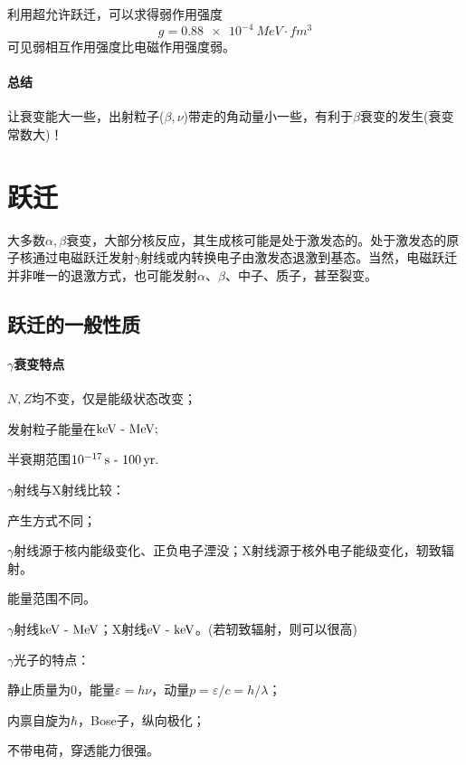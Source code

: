 利用超允许跃迁，可以求得弱作用强度
\[
	g=\SI{0.88e-4}{MeV\cdot fm^3}
\]
可见弱相互作用强度比电磁作用强度弱。
\paragraph{总结}
让衰变能大一些，出射粒子($\beta,\nu$)带走的角动量小一些，有利于$\beta$衰变的发生(衰变常数大)！

\section{\textgamma 跃迁}

大多数$\alpha,\beta$衰变，大部分核反应，其生成核可能是处于激发态的。处于激发态的原子核通过电磁跃迁发射$\gamma$射线或内转换电子由激发态退激到基态。当然，电磁跃迁并非唯一的退激方式，也可能发射$\alpha$、$\beta$、中子、质子，甚至裂变。

\subsection{\textgamma 跃迁的一般性质}

\paragraph{$\gamma$衰变特点}
\begin{compactenum}
	\item $N,Z$均不变，仅是能级状态改变；
	\item 发射粒子能量在$\si{keV}\vs\si{MeV};$
	\item 半衰期范围$\SI{e-17}{s}\vs\SI{100}{yr}.$
\end{compactenum}
$\gamma$射线与X射线比较：
\begin{compactenum}
	\item 产生方式不同；
	
	$\gamma$射线源于核内能级变化、正负电子湮没；X射线源于核外电子能级变化，轫致辐射。
	\item 能量范围不同。
	
	$\gamma$射线$\si{keV}\vs\si{MeV}$；X射线$\si{eV}\vs\si{keV}$。(若轫致辐射，则可以很高)
\end{compactenum}
$\gamma$光子的特点：
\begin{compactenum}
	\item 静止质量为0，能量$\varepsilon=h\nu$，动量$p=\varepsilon/c=h/\lambda$；
	\item 内禀自旋为$\hbar$，Bose子，纵向极化；
	\item 不带电荷，穿透能力很强。
\end{compactenum}
